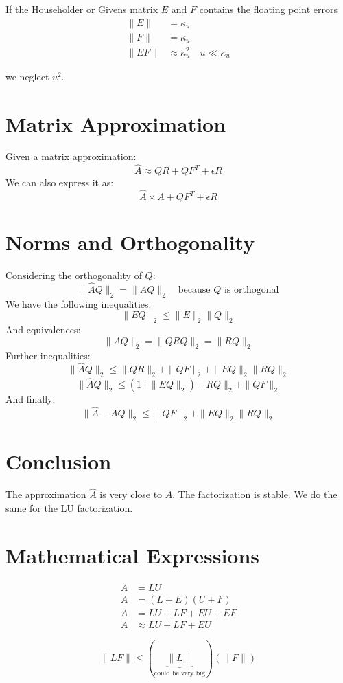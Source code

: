 If the Householder or Givens matrix $E$ and $F$ contains the floating point errors
\begin{align*}
\|E\| &= \kappa_u \\
\|F\| &= \kappa_u \\
\|EF\| &\approx \kappa_u^2 \quad u \ll \kappa_u
\end{align*}

we neglect $u^2$.

\section*{Matrix Approximation}

Given a matrix approximation:
\[
\hat{A} \approx QR + QF^T + \epsilon R
\]
We can also express it as:
\[
\hat{A} \times A + QF^T + \epsilon R
\]

\section*{Norms and Orthogonality}

Considering the orthogonality of $Q$:
\[
\|\hat{A}Q\|_2 = \|AQ\|_2 \quad \text{because $Q$ is orthogonal}
\]
We have the following inequalities:
\[
\|EQ\|_2 \leq \|E\|_2\|Q\|_2
\]
And equivalences:
\[
\|AQ\|_2 = \|QRQ\|_2 = \|RQ\|_2
\]
Further inequalities:
\[
\|\hat{A}Q\|_2 \leq \|QR\|_2 + \|QF\|_2 + \|EQ\|_2\|RQ\|_2
\]
\[
\|\hat{A}Q\|_2 \leq (1 + \|EQ\|_2)\|RQ\|_2 + \|QF\|_2
\]
And finally:
\[
\|\hat{A} - AQ\|_2 \leq \|QF\|_2 + \|EQ\|_2\|RQ\|_2
\]

\section*{Conclusion}

The approximation $\hat{A}$ is very close to $A$. The factorization is stable. We do the same for the LU factorization.

\section*{Mathematical Expressions}

\begin{align*}
A &= LU \\
A &= (L + E)(U + F) \\
A &= LU + LF + EU + EF \\
A &\approx LU + LF + EU
\end{align*}

\begin{mdframed}[backgroundcolor=blue!20]
\[\|LF\| \leq (\underbrace{\|L\|}_{\text{could be very big}}) (\|F\|)\]
\end{mdframed}

